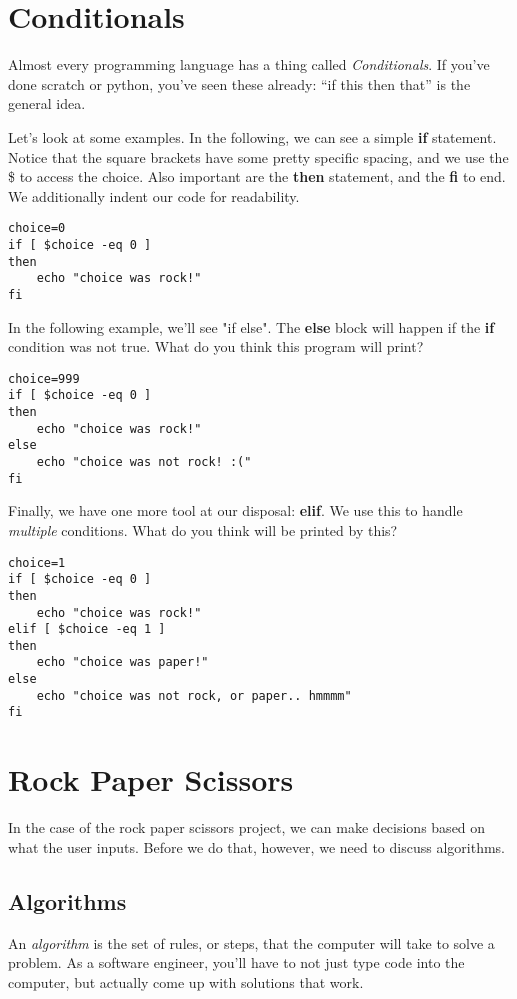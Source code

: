\documentclass{article}
\begin{document}
\section*{Conditionals}
Almost every programming language has a thing called \textit{Conditionals}. If
you've done scratch or python, you've seen these already: ``if this then that''
is the general idea.

Let's look at some examples. In the following, we can see a simple \textbf{if}
statement. Notice that the square brackets have some pretty specific spacing,
and we use the \$ to access the choice. Also important are the \textbf{then}
statement, and the \textbf{fi} to end. We additionally indent our code for
readability.
\begin{lstlisting}
choice=0
if [ $choice -eq 0 ]
then
    echo "choice was rock!"
fi
\end{lstlisting}

In the following example, we'll see "if else". The \textbf{else} block will
happen if the \textbf{if} condition was not true. What do you think this
program will print?
\begin{lstlisting}
choice=999
if [ $choice -eq 0 ]
then
    echo "choice was rock!"
else
    echo "choice was not rock! :("
fi
\end{lstlisting}

Finally, we have one more tool at our disposal: \textbf{elif}. We use this to
handle \textit{multiple} conditions. What do you think will be printed by this?
\begin{lstlisting}
choice=1
if [ $choice -eq 0 ]
then
    echo "choice was rock!"
elif [ $choice -eq 1 ]
then
    echo "choice was paper!"
else
    echo "choice was not rock, or paper.. hmmmm"
fi
\end{lstlisting}

\section*{Rock Paper Scissors}
In the case of the rock paper scissors project, we can make decisions based on
what the user inputs. Before we do that, however, we need to discuss algorithms.
\subsection*{Algorithms}
An \textit{algorithm} is the set of rules, or steps, that the computer will
take to solve a problem. As a software engineer, you'll have to not just type
code into the computer, but actually come up with solutions that work.
\end{document}
